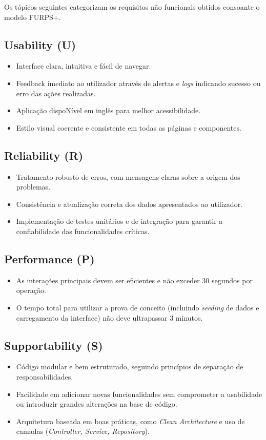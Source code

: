 Os tópicos seguintes categorizam os requisitos não funcionais obtidos consoante o modelo FURPS+.

\subsection{Usability (U)}
\begin{itemize}
    \item Interface clara, intuitiva e fácil de navegar.
    \item Feedback imediato ao utilizador através de alertas e \textit{logs} indicando sucesso ou erro das ações realizadas.
    \item Aplicação dispoNível em inglês para melhor acessibilidade.
    \item Estilo visual coerente e consistente em todas as páginas e componentes.
\end{itemize}

\subsection{Reliability (R)}
\begin{itemize}
    \item Tratamento robusto de erros, com mensagens claras sobre a origem dos problemas.
    \item Consistência e atualização correta dos dados apresentados ao utilizador.
    \item Implementação de testes unitários e de integração para garantir a confiabilidade das funcionalidades críticas.
\end{itemize}

\subsection{Performance (P)}
\begin{itemize}
    \item As interações principais devem ser eficientes e não exceder 30 segundos por operação.
    \item O tempo total para utilizar a prova de conceito (incluindo \textit{seeding} de dados e carregamento da interface) não deve ultrapassar 3 minutos.
\end{itemize}

\subsection{Supportability (S)}
\begin{itemize}
    \item Código modular e bem estruturado, seguindo princípios de separação de responsabilidades.
    \item Facilidade em adicionar novas funcionalidades sem comprometer a usabilidade ou introduzir grandes alterações na base de código.
    \item Arquitetura baseada em boas práticas, como \textit{Clean Architecture} e uso de camadas (\textit{Controller, Service, Repository}).
\end{itemize}

